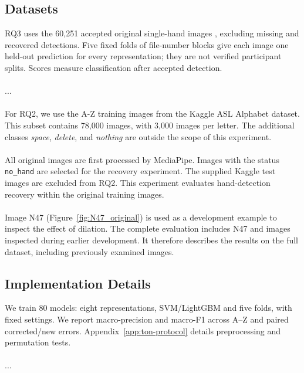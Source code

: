     \subsection{Datasets}

RQ3 uses the 60,251 accepted original single-hand images \citep{ton-asl_alphabet}, excluding missing and recovered detections. Five fixed folds of file-number blocks give each image one held-out prediction for every representation; they are not verified participant splits. Scores measure classification after accepted detection.
\leavevmode 
        \\\\
        ...
        \\\\
        
        For RQ2, we use the A-Z training images from the Kaggle ASL Alphabet dataset. This subset contains 78,000 images, with 3,000 images per letter. The additional classes \textit{space}, \textit{delete}, and \textit{nothing} are outside the scope of this experiment.
        \\\\
        All original images are first processed by MediaPipe. Images with the status \texttt{no\_hand} are selected for the recovery experiment. The supplied Kaggle test images are excluded from RQ2. This experiment evaluates hand-detection recovery within the original training images.
        \\\\
        Image N47 (Figure~\ref{fig:N47_original}) is used as a development example to inspect the effect of dilation. The complete evaluation includes N47 and images inspected during earlier development. It therefore describes the results on the full dataset, including previously examined images.
        
    \subsection{Implementation Details}
We train 80 models: eight representations, SVM/LightGBM and five folds, with fixed settings. We report macro-precision and macro-F1 across A--Z and paired corrected/new errors. Appendix~\ref{app:ton-protocol} details preprocessing and permutation tests.
\leavevmode 
        \\\\
        ...
        \\\\
        
